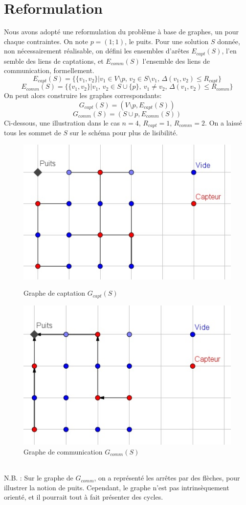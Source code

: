 \documentclass[12pt,a4paper]{article}
\begin{document}
\section{Reformulation}
Nous avons adopté une reformulation du problème à base de graphes, un pour chaque contraintes. On note $p=(1;1)$, le puits. 
Pour une solution $S$ donnée, non nécessairement réalisable, on défini les ensembles d'arêtes $E_{capt}(S)$, l'en semble des liens de captations, et $E_{comm}(S)$ l'ensemble des liens de communication,  formellement.
\[E_{capt}(S)=\{\{v_1,v_2\}|v_1\in V\setminus p,\,v_2\in S\setminus v_1,\, \Delta(v_1,v_2)\leq R_{capt}\}\] 
\[E_{comm}(S)=\{\{v_1,v_2\}|v_1,\,v_2\in S\cup \{p\},\ v_1\neq v_2,\,\Delta(v_1,v_2)\leq R_{comm}\}\] 
On peut alors construire les graphes correspondants:
\[G_{capt}(S)=(V\setminus p,E_{capt}(S))\]
\[G_{comm}(S)=(S\cup p,E_{comm}(S))\]
Ci-dessous, une illustration dans le cas $n=4$, $R_{capt}=1$, $R_{comm}=2$. On a laissé tous les sommet de $S$ sur le schéma pour plus de lisibilité.
\begin{figure}[!h]
\center
\includegraphics[scale=1]{Images/4_1_2_captgraph.jpg}
\caption{Graphe de captation $G_{capt}(S)$}
\includegraphics[scale=1]{Images/4_1_2_commgraph.jpg}
\caption{Graphe de communication $G_{comm}(S)$}
\end{figure}
\\N.B. : Sur le graphe de $G_{comm}$, on a représenté les arrêtes par des flèches, pour illustrer la notion de puits. Cependant, le graphe n'est pas intrinsèquement orienté, et il pourrait tout à fait présenter des cycles.
\end{document}
